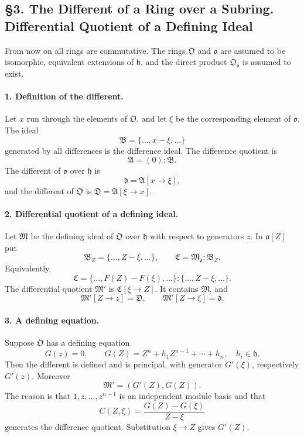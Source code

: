 \documentclass[11pt]{article}
\begin{document}
\subsection*{§3. The Different of a Ring over a Subring. Differential Quotient of a Defining Ideal}

From now on all rings are commutative. The rings $\mathfrak O$ and $\mathfrak o$ are assumed to be isomorphic, equivalent extensions of $\mathfrak h$, and the direct product $\mathfrak O_{\mathfrak o}$ is assumed to exist.

\paragraph{1. Definition of the different.}
Let $x$ run through the elements of $\mathfrak O$, and let $\xi$ be the corresponding element of $\mathfrak o$. The ideal
\[
        \mathfrak B=\{\ldots,x-\xi,\ldots\}
\]
generated by all differences is the difference ideal. The difference quotient is
\[
        \mathfrak A=(0):\mathfrak B.
\]
The different of $\mathfrak o$ over $\mathfrak h$ is
\[
        \mathfrak d=\mathfrak A[x\to\xi],
\]
and the different of $\mathfrak O$ is $\mathfrak D=\mathfrak A[\xi\to x]$.

\paragraph{2. Differential quotient of a defining ideal.}
Let $\mathfrak M$ be the defining ideal of $\mathfrak O$ over $\mathfrak h$ with respect to generators $z$. In $\mathfrak o[Z]$ put
\[
        \mathfrak B_Z=\{\ldots,Z-\xi,\ldots\},
        \qquad
        \mathfrak C=\mathfrak M_{\mathfrak o}:\mathfrak B_Z.
\]
Equivalently,
\[
        \mathfrak C=\{\ldots,F(Z)-F(\xi),\ldots\}:\{\ldots,Z-\xi,\ldots\}.
\]
The differential quotient $\mathfrak M'$ is $\mathfrak C[\xi\to Z]$. It contains $\mathfrak M$, and
\[
        \mathfrak M'[Z\to z]=\mathfrak D,
        \qquad
        \mathfrak M'[Z\to\xi]=\mathfrak d.
\]

\paragraph{3. A defining equation.}
Suppose $\mathfrak O$ has a defining equation
\[
        G(z)=0,
        \qquad
        G(Z)=Z^n+h_1Z^{n-1}+\cdots+h_n,
        \quad h_i\in\mathfrak h.
\]
Then the different is defined and is principal, with generator $G'(\xi)$, respectively $G'(z)$. Moreover
\[
        \mathfrak M'=(G'(Z),G(Z)).
\]
The reason is that $1,z,\ldots,z^{n-1}$ is an independent module basis and that
\[
        C(Z,\xi)=\frac{G(Z)-G(\xi)}{Z-\xi}
\]
generates the difference quotient. Substitution $\xi\to Z$ gives $G'(Z)$.
\end{document}
